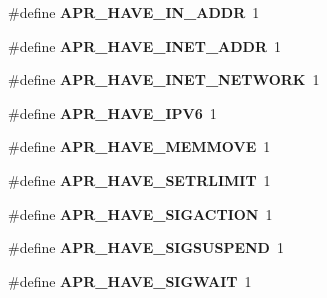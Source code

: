 \begin{DoxyCompactItemize}
\item 
\hypertarget{group__apr__platform_ga2713eb83fc527f0b262b58c0c449cdcb}{\#define {\bfseries A\-P\-R\-\_\-\-H\-A\-V\-E\-\_\-\-I\-N\-\_\-\-A\-D\-D\-R}~1}\label{group__apr__platform_ga2713eb83fc527f0b262b58c0c449cdcb}

\item 
\hypertarget{group__apr__platform_ga0c38cccb121e483045a2564bb1ae61ec}{\#define {\bfseries A\-P\-R\-\_\-\-H\-A\-V\-E\-\_\-\-I\-N\-E\-T\-\_\-\-A\-D\-D\-R}~1}\label{group__apr__platform_ga0c38cccb121e483045a2564bb1ae61ec}

\item 
\hypertarget{group__apr__platform_gaadacfca3c1cbae0447c1b4d4ea499d57}{\#define {\bfseries A\-P\-R\-\_\-\-H\-A\-V\-E\-\_\-\-I\-N\-E\-T\-\_\-\-N\-E\-T\-W\-O\-R\-K}~1}\label{group__apr__platform_gaadacfca3c1cbae0447c1b4d4ea499d57}

\item 
\hypertarget{group__apr__platform_gab42a2abcd9e58a79b4bf40e8f02e57a2}{\#define {\bfseries A\-P\-R\-\_\-\-H\-A\-V\-E\-\_\-\-I\-P\-V6}~1}\label{group__apr__platform_gab42a2abcd9e58a79b4bf40e8f02e57a2}

\item 
\hypertarget{group__apr__platform_ga0aff7b8d78dc6cea94892a3738bc0edf}{\#define {\bfseries A\-P\-R\-\_\-\-H\-A\-V\-E\-\_\-\-M\-E\-M\-M\-O\-V\-E}~1}\label{group__apr__platform_ga0aff7b8d78dc6cea94892a3738bc0edf}

\item 
\hypertarget{group__apr__platform_ga4a858c53da127087a9bef6105531ce54}{\#define {\bfseries A\-P\-R\-\_\-\-H\-A\-V\-E\-\_\-\-S\-E\-T\-R\-L\-I\-M\-I\-T}~1}\label{group__apr__platform_ga4a858c53da127087a9bef6105531ce54}

\item 
\hypertarget{group__apr__platform_ga2ed59eb76fdfc4d332a1ef5583206f05}{\#define {\bfseries A\-P\-R\-\_\-\-H\-A\-V\-E\-\_\-\-S\-I\-G\-A\-C\-T\-I\-O\-N}~1}\label{group__apr__platform_ga2ed59eb76fdfc4d332a1ef5583206f05}

\item 
\hypertarget{group__apr__platform_ga661ccf871e31f9e8e4adc75dbfd67951}{\#define {\bfseries A\-P\-R\-\_\-\-H\-A\-V\-E\-\_\-\-S\-I\-G\-S\-U\-S\-P\-E\-N\-D}~1}\label{group__apr__platform_ga661ccf871e31f9e8e4adc75dbfd67951}

\item 
\hypertarget{group__apr__platform_ga0117237934a6095a050a9d39ff152a26}{\#define {\bfseries A\-P\-R\-\_\-\-H\-A\-V\-E\-\_\-\-S\-I\-G\-W\-A\-I\-T}~1}\label{group__apr__platform_ga0117237934a6095a050a9d39ff152a26}


\end{DoxyCompactItemize}
